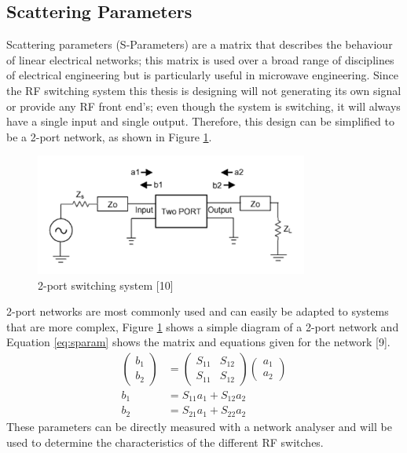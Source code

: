 \documentclass[12pt,openany,a4paper]{book}
\begin{document}
\subsection{Scattering Parameters}
Scattering parameters (S-Parameters) are a matrix that describes the behaviour of linear electrical networks; this matrix is used over a broad range of disciplines of electrical engineering but is particularly useful in microwave engineering.
Since the RF switching system this thesis is designing will not generating its own signal or provide any RF front end's; even though the system is switching, it will always have a single input and single output. Therefore, this design can be simplified to be a 2-port network, as shown in Figure \ref{fig:sparam}.
\begin{figure}[H]
	\centering
    \includegraphics[width=0.8\textwidth]{sparam.png}
	\caption{2-port switching system [10]}
	\label{fig:sparam}
\end{figure} 
2-port networks are most commonly used and can easily be adapted to systems that are more complex, Figure \ref{fig:sparam} shows a simple diagram of a 2-port network and Equation \ref{eq:sparam} shows the matrix and equations given for the network [9].
\begin{align}
\left( \begin{array}{c}
b_1 \\
b_2 \end{array} \right) &=
\left( \begin{array}{cc}
S_{11} & S_{12} \\
S_{11} & S_{12} \end{array} \right)
\left( \begin{array}{c}
a_1 \\
a_2 \end{array} \right) \label{eq:sparam} \\
b_1 &= S_{11}a_1+S_{12}a_2 \nonumber \\
b_2 &= S_{21}a_1+S_{22}a_2 \nonumber
\end{align}
These parameters can be directly measured with a network analyser and will be used to determine the characteristics of the different RF switches.
\end{document}
